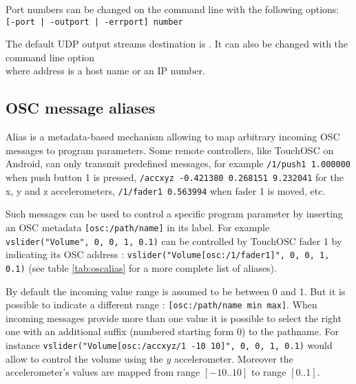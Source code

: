Port numbers can be changed on the command line with the following options: \\
\hspace*{6mm}\lstinline'[-port | -outport | -errport] number'

The default UDP output streams destination is . It can also be changed with the command line option \\
\hspace*{6mm} where address is a host name or an IP number.

\subsection{OSC message aliases}
\label{sec:oscaudio}
Alias is a metadata-based mechanism allowing to map arbitrary incoming OSC messages to program parameters. 
Some remote controllers, like TouchOSC on Android, can only transmit predefined messages, for example \lstinline'/1/push1 1.000000' when push button 1 is pressed, \lstinline'/accxyz -0.421380 0.268151 9.232041' for the x, y and z accelerometers, \lstinline'/1/fader1 0.563994' when fader 1 is moved, etc. 

Such messages can be used to control a specific program parameter by inserting an OSC metadata \lstinline'[osc:/path/name]' in its label. For example \lstinline'vslider("Volume", 0, 0, 1, 0.1)' can be controlled by TouchOSC fader 1 by indicating its OSC address : \lstinline'vslider("Volume[osc:/1/fader1]", 0, 0, 1, 0.1)' (see table \ref{tab:oscalias} for a more complete list of aliases).  

By default the incoming value range is assumed to be between 0 and 1. But it is possible to indicate a different range : \lstinline'[osc:/path/name min max]'. When incoming messages provide more than one value it is possible to select the right one with an additional suffix (numbered starting form 0) to the pathname.  For instance \lstinline'vslider("Volume[osc:/accxyz/1 -10 10]", 0, 0, 1, 0.1)' would allow to control the volume using the $y$ accelerometer. Moreover the accelerometer's values are mapped from range $[-10..10]$ to range $[0..1]$.


